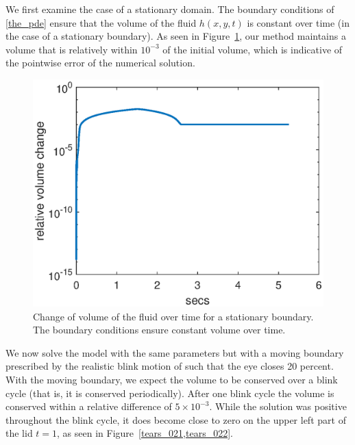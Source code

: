 We first examine the case of a stationary domain. The boundary conditions of \ref{the_pde} ensure that the volume of the fluid $h(x,y,t)$ is constant over time (in the case of a stationary boundary). As seen in Figure~\ref{eye_volume}, our method maintains a volume that is relatively within $10^{-3}$ of the initial volume, which is indicative of the pointwise error of the numerical solution.

\begin{figure}
	\centering
	\includegraphics[scale=0.8]{Chapter4/stationary_volume_change}
	\caption{Change of volume of the fluid over time for a stationary boundary. The boundary conditions ensure constant volume over time.}
	\label{eye_volume}
\end{figure}

We now solve the model with the same parameters but with a moving boundary prescribed by the realistic blink motion of \cite{deng2014heat} such that the eye closes 20 percent. With the moving boundary, we expect the volume to be conserved over a blink cycle (that is, it is conserved periodically). After one blink cycle the volume is conserved within a relative difference of $5 \times 10^{-3}$. While the solution was positive throughout the blink cycle, it does become close to zero on the upper left part of the lid $t=1$, as seen in Figure~\ref{tears_021,tears_022}.


